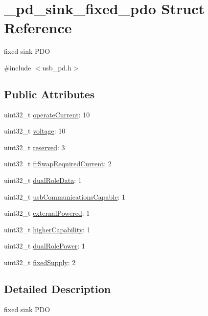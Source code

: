 \hypertarget{struct__pd__sink__fixed__pdo}{\section{\-\_\-pd\-\_\-sink\-\_\-fixed\-\_\-pdo Struct Reference}
\label{struct__pd__sink__fixed__pdo}
}


fixed sink P\-D\-O  




{\ttfamily \#include $<$usb\-\_\-pd.\-h$>$}

\subsection*{Public Attributes}
\begin{DoxyCompactItemize}
\item 
uint32\-\_\-t \hyperlink{struct__pd__sink__fixed__pdo_a264499e662c6bb82e0e25fc3d296b88b}{operate\-Current}\-: 10
\item 
uint32\-\_\-t \hyperlink{struct__pd__sink__fixed__pdo_a5e095a725455f85faa43a1573e62b798}{voltage}\-: 10
\item 
uint32\-\_\-t \hyperlink{struct__pd__sink__fixed__pdo_a209b36f044c02c50495b3b688be779cf}{reserved}\-: 3
\item 
uint32\-\_\-t \hyperlink{struct__pd__sink__fixed__pdo_a31798efee281f6d1c69ff96d7a79e113}{fr\-Swap\-Required\-Current}\-: 2
\item 
uint32\-\_\-t \hyperlink{struct__pd__sink__fixed__pdo_a6e8fb8552ee54c1d0227a03b5d7aecbf}{dual\-Role\-Data}\-: 1
\item 
uint32\-\_\-t \hyperlink{struct__pd__sink__fixed__pdo_aa19552768100717810142b8c4df3835c}{usb\-Communications\-Capable}\-: 1
\item 
uint32\-\_\-t \hyperlink{struct__pd__sink__fixed__pdo_a44e4b2e4bc2b34929036acee6ff6ae34}{external\-Powered}\-: 1
\item 
uint32\-\_\-t \hyperlink{struct__pd__sink__fixed__pdo_a511903e5dca26d874a304e558db6cc72}{higher\-Capability}\-: 1
\item 
uint32\-\_\-t \hyperlink{struct__pd__sink__fixed__pdo_a9ff5e34e2bf3e62a6b4dc017f559c061}{dual\-Role\-Power}\-: 1
\item 
uint32\-\_\-t \hyperlink{struct__pd__sink__fixed__pdo_a9290ef90d4336be4642f40aac2da8f5e}{fixed\-Supply}\-: 2
\end{DoxyCompactItemize}


\subsection{Detailed Description}
fixed sink P\-D\-O 

